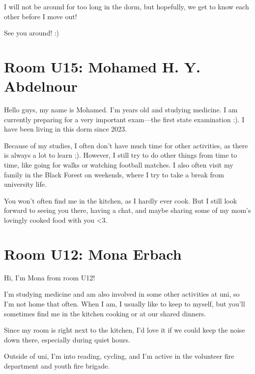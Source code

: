 I will not be around for too long in the dorm, but hopefully, we get to know each other before I move out!

See you around! :)

\section{Room U15: Mohamed H. Y. Abdelnour} \label{sec:mohamedA}
%
\FPsub\result{\theCurrentDate}{\theBirthdate}
\FPdiv{}
\FPtrunc{}

Hello guys, my name is Mohamed. I’m \myage{} years old and studying medicine. I am currently preparing for a very important exam—the first state examination :). I have been living in this dorm since 2023.

Because of my studies, I often don’t have much time for other activities, as there is always a lot to learn ;). However, I still try to do other things from time to time, like going for walks or watching football matches. I also often visit my family in the Black Forest on weekends, where I try to take a break from university life.

You won’t often find me in the kitchen, as I hardly ever cook. But I still look forward to seeing you there, having a chat, and maybe sharing some of my mom’s lovingly cooked food with you <3.

\section{Room U12: Mona Erbach}\label{sec:monaE}
Hi, I’m Mona from room U12!

I’m studying medicine and am also involved in some other activities at uni, so I’m not home that often. When I am, I usually like to keep to myself, but you’ll sometimes find me in the kitchen cooking or at our shared dinners.

Since my room is right next to the kitchen, I’d love it if we could keep the noise down there, especially during quiet hours.

Outside of uni, I’m into reading, cycling, and I’m active in the volunteer fire department and youth fire brigade.